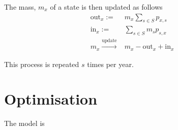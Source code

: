 \documentclass[]{article}
\begin{document}
	The mass, $m_{x}$ of a state is then updated as follows
	\begin{align*}
		\text{out}_x :=& m_x\sum_{s \in S} p_{x,s} \\
		\text{in}_x :=& \sum_{s \in S}m_s p_{s,x} \\
		m_x \xrightarrow{\text{update}}& m_x - \text{out}_x + \text{in}_x
	\end{align*}
	
	This process is repeated $s$ times per year.
	
	\section{Optimisation}
	
	The model is 
	
\end{document}
